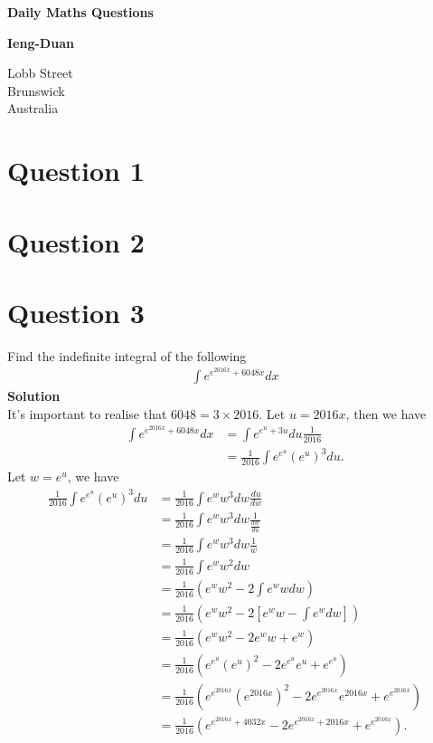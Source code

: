 \documentclass[12pt]{article}
\numberwithin{equation}{subsection}
\begin{document}
\begin{titlepage}
    \begin{center}
        \vspace*{1cm}
        
        \textbf{\LARGE Daily Maths Questions}
        
        \vspace{1.5cm}
        
        \textbf{Ieng-Duan}
        
        \vspace{0.8cm}
        
        Lobb Street\\
        Brunswick\\
        Australia
        
    \end{center}
\end{titlepage}

\newpage
\section*{Question 1}

\section*{Question 2}


\section*{Question 3}
Find the indefinite integral of the following
\begin{align}
\int e^{e^{2016x} + 6048x} dx
\end{align}
\textbf{Solution}\\
It's important to realise that $6048 = 3\times 2016$. Let $u = 2016x$, then we have
\begin{align*}
\int e^{e^{2016x} + 6048x} dx & = \int e^{e^{u}+3u} du \frac{1}{2016}\\
&= \frac{1}{2016}\int e^{e^u}(e^{u})^3du. 
\end{align*}
Let $w = e^u$, we have
\begin{align*}
 \frac{1}{2016}\int e^{e^u}(e^{u})^3du &=  \frac{1}{2016}\int e^{w}w^3dw\frac{du}{dw}\\
&=  \frac{1}{2016}\int e^{w}w^3dw\frac{1}{\frac{dw}{du}}\\
&=  \frac{1}{2016}\int e^{w}w^3dw\frac{1}{w}\\
&=  \frac{1}{2016}\int e^{w}w^2dw\\
&=  \frac{1}{2016}(e^w w^2 - 2\int e^{w}wdw )\\
&=  \frac{1}{2016}(e^w w^2 - 2[ e^{w}w - \int e^wdw ])\\
&=  \frac{1}{2016}(e^w w^2 - 2e^{w}w +  e^w)\\
&=  \frac{1}{2016}(e^{e^u} (e^u)^2 - 2e^{e^u}e^u +  e^{e^u})\\
&=  \frac{1}{2016}(e^{e^{2016x}} (e^{2016x})^2 - 2e^{e^{2016x}}e^{2016x} +  e^{e^{2016x}})\\
&=  \frac{1}{2016}(e^{e^{2016x} + 4032x} - 2e^{e^{2016x} + 2016x} +  e^{e^{2016x}}).
\end{align*}
\end{document}
